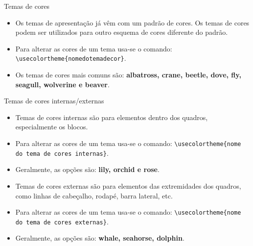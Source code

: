 \documentclass{beamer}
\begin{document}
\begin{frame}[fragile]
    \begin{block}{Temas de cores}
        
        \begin{itemize} \justifying
            \item <1-> Os temas de apresentação já vêm com um padrão de cores. Os temas de cores podem ser utilizados para outro esquema de cores diferente do padrão.
            
            \item <2-> Para alterar as cores de um tema usa-se o comando: \verb|\usecolortheme{nomedotemadecor}|.

            \item <3-> Os temas de cores mais comuns são: \textbf{albatross, crane, beetle, dove, fly, seagull, wolverine e beaver}.
        \end{itemize}
    \end{block}
\end{frame}

\begin{frame}[fragile]
    \begin{block}{Temas de cores internas/externas}
        
        \begin{itemize} \justifying
            \item <1-> Temas de cores internas são para elementos dentro dos quadros, especialmente os blocos.
            
            \item <2-> Para alterar as cores de um tema usa-se o comando: \verb|\usecolortheme{nome do tema de cores internas}|.

            \item <3-> Geralmente, as opções são: \textbf{lily, orchid e rose}.

            \item <4-> Temas de cores externas são para elementos das extremidades dos quadros, como linhas de cabeçalho, rodapé, barra lateral, etc.

            \item <5-> Para alterar as cores de um tema usa-se o comando: \verb|\usecolortheme{nome do tema de cores externas}|.

            \item <6-> Geralmente, as opções são: \textbf{whale, seahorse, dolphin}.
        \end{itemize}
    \end{block}
\end{frame}
\end{document}

